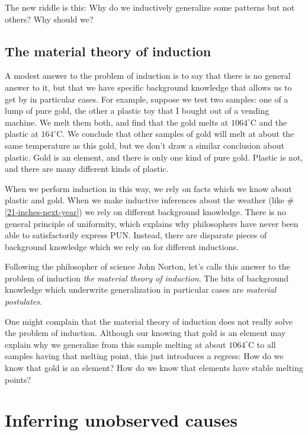 \documentclass[]{article}
\begin{document}
The new riddle is this: Why do we inductively generalize some patterns but not others? Why should we?


\subsection{The material theory of induction}

A modest answer to the problem of induction is to say that there is no general answer to it, but that we have specific background knowledge that allows us to get by in particular cases. For example, suppose we test two samples: one of a lump of pure gold, the other a plastic toy that I bought out of a vending machine. We melt them both, and find that the gold melts at $1064^{\circ}$C and the plastic at $164^{\circ}$C. We conclude that other samples of gold will melt at about the same temperature as this gold, but we don't draw a similar conclusion about plastic. Gold is an element, and there is only one kind of pure gold. Plastic is not, and there are many different kinds of plastic.

When we perform induction in this way, we rely on facts which we know about plastic and gold. When we make inductive inferences about the weather (like \#\ref{21-inches-next-year}) we rely on different background knowledge. There is no general principle of uniformity, which explains why philosophers have never been able to satisfactorily express PUN. Instead, there are disparate pieces of background knowledge which we rely on for different inductions.

Following the philosopher of science John Norton, let's calls this answer to the problem of induction \emph{the material theory of induction}. The bits of background knowledge which underwrite generalization in particular cases are \emph{material postulates}.

One might complain that the material theory of induction does not really solve the problem of induction. Although our knowing that gold is an element may explain why we generalize from this sample melting at about $1064^{\circ}$C to all samples having that melting point, this just introduces a regress: How do we know that gold is an element? How do we know that elements have stable melting points?






\section{Inferring unobserved causes}
\end{document}
